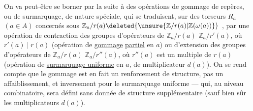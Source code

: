 On va peut-être se borner par la suite à des opérations de gommage de repères, ou de surmarquage, de nature spéciale, qui se traduisent, sur  des torseurs $R_a$ $(a\in A)$ concernés sous
$\mathbb Z_a/r(a)\deleted{\unsure{\mathbb Z/r(a)|\mathbb Z(\omega(a))}}$
,
par une opération de contraction des groupes d'opérateurs de $\mathbb Z_a/r(a)$  $\mathbb Z_a/r'(a)$, où $r'(a)\mid r(a)$
(opération de \uline{gommage} \uline{partiel}  en $a$)
ou d'extension des groupes d'opérateurs de $\mathbb Z_a/r(a)$  $\mathbb Z_a/r''(a)$, où $r''(a)$  est un multiple de $r(a)$
(opération de \uline{surmarquage uniforme} en $a$, \deleted{)} de multiplicateur $d(a)$).
On se rend compte  que le gommage  est en fait un renforcement de structure, pas un affaiblissement, et inversement pour le surmarquage uniforme --- qui, au niveau combinatoire, sera défini sans donnée de structure supplémentaire (sauf bien sûr les multiplicateurs $d(a)$).
